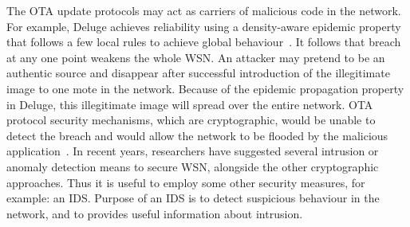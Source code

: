 \documentclass[conference,final]{IEEEtran}
\begin{document}
The OTA update protocols may act as carriers of malicious
code in the network. For example, Deluge achieves reliability
using a density-aware epidemic property that 
follows a few local rules to achieve global
behaviour~\cite{1031506}.
It follows that breach at any one point weakens
the whole WSN. An attacker may pretend to be an authentic
source and disappear after successful introduction of the illegitimate image to one mote in the network. 
Because of the epidemic propagation property in Deluge, this illegitimate image will spread over the entire network.
OTA protocol security mechanisms, which are cryptographic, would be unable to
detect the breach and would allow the network to be flooded
by the malicious application~\cite{Karlof:2004:TLL:1031495.1031515}.
In recent years, researchers
have suggested several intrusion or anomaly detection means
to secure WSN, alongside the other cryptographic approaches.
Thus it is useful to employ some other security measures, for
example: an IDS. Purpose of an IDS is to detect suspicious
behaviour in the network, and to provides useful information about
intrusion.
\end{document}
